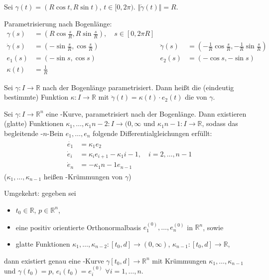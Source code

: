 \begin{example}
	Sei $\gamma(t) = (R\cos t, R\sin t)$, $t\in [0,2\pi)$. $\Vert \dot{\gamma}(t)\Vert = R$.
	
	Parametrisierung nach Bogenlänge: \begin{align*}
		\gamma(s) &= \left(R\cos \frac{s}{R}, R\sin \frac{s}{R}\right),\quad s\in[0,2\pi R]\\
		\dot{\gamma}(s) &= \left(-\sin \frac{s}{R},\cos\frac{s}{R} \right)&
		\ddot{\gamma}(s) &= \left(- \frac{1}{R}\cos \frac{s}{R}, -\frac{1}{R}\sin \frac{s}{R}\right) \\
		e_1(s) &= (-\sin s, \cos s) & e_2(s) &= (-\cos s, -\sin s)\\
		\kappa(t) &= \frac{1}{R}
	\end{align*}
\end{example}

\begin{definition}
	Sei $\gamma\!:I\to\mathbb{R}$ nach der Bogenlänge parametrisiert. Dann heißt die (eindeutig bestimmte) Funktion $\kappa\!:I\to\mathbb{R}$ mit $\ddot{\gamma}(t) = \kappa(t) \cdot e_2(t)$ die  von $\gamma$.
\end{definition}

\begin{proposition}
	Sei $\gamma\!:I\to\mathbb{R}^n$ eine -Kurve, parametrisiert nach der Bogenlänge. Dann existieren (glatte) Funktionen $\kappa_1, \dotsc, \kappa_1{n-2}\!:I\to(0,\infty$ und $\kappa_1{n-1}\!:I\to\mathbb{R}$, sodass das begleitende -$n$-Bein $e_1,\dotsc, e_n$ folgende Differentialgleichungen erfüllt: \begin{equation}
		\begin{gathered}
			\begin{aligned}
			\dot{e_1} &= \kappa_1 e_2 \\
			\dot{e}_i &= \kappa_i e_{i+1} - \kappa_1{i-1},\quad i=2,\dotsc,n-1\\
			\dot{e}_n &= -\kappa_1{n-1} e_{n-1}
			\end{aligned}
		\end{gathered}
	\end{equation}
	($\kappa_1,\dotsc,\kappa_{n-1}$ heißen -Krümmungen von $\gamma$)
	
	Umgekehrt: gegeben sei
	\begin{itemize}
		\item $t_0\in\mathbb{R}$, $p\in\mathbb{R}^n$,
		\item eine positiv orientierte Orthonormalbasis $e_1^{(0)}, \dotsc, e_n^{(0)}$ in $\mathbb{R}^n$, sowie
		\item glatte Funktionen $\kappa_1,\dotsc,\kappa_{n-2}\!:[t_0,d]\to(0,\infty)$, $\kappa_{n-1}\!:[t_0,d]\to\mathbb{R}$,
	\end{itemize}
	dann existiert genau eine -Kurve $\gamma\![t_0,d]\to\mathbb{R}^n$ mit Krümmungen $\kappa_1,\dotsc,\kappa_{n-1}$ und $\gamma(t_0) = p$, $e_i(t_0) = e_i^{(0)}$ $\forall i=1,\dotsc,n$.
\end{proposition}